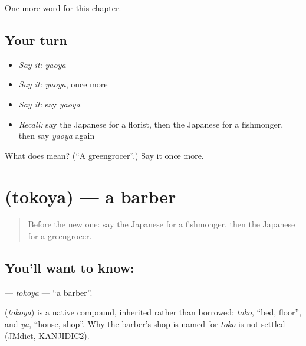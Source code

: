 \begin{grammarlens}[title={What you've built}]
One more word for this chapter.
\end{grammarlens}

\subsection*{Your turn}
\begin{itemize}
\raggedright
  \item \emph{Say it:} \emph{yaoya}
  \item \emph{Say it:} \emph{yaoya}, once more
  \item \emph{Say it:} say \emph{yaoya}
  \item \emph{Recall:} say the Japanese for a florist, then the Japanese for a fishmonger, then say \emph{yaoya} again
\end{itemize}

\begin{tcolorbox}[breakable,colback=teal!4,colframe=teal!35!black,title={Before you move on}]
What does  mean? (\textquotedblleft{}A greengrocer\textquotedblright{}.) Say it once more.
\end{tcolorbox}
\section[\texorpdfstring{\ja{とこや} (tokoya)}{とこや (tokoya)}]{ (tokoya) — a barber}

\label{lesson:JA-C119-tokoya}



\begin{quote}
Before the new one: say the Japanese for a fishmonger, then the Japanese for a greengrocer.
\end{quote}

\subsection*{You'll want to know: }
\textbf{} — \emph{tokoya} — \textquotedblleft{}a barber\textquotedblright{}.

\begin{cousinweb}
\textbf{} (\emph{tokoya}) is a native compound, inherited rather than borrowed: \emph{toko}, \textquotedblleft{}bed, floor\textquotedblright{}, and \emph{ya}, \textquotedblleft{}house, shop\textquotedblright{}. Why the barber's shop is named for \emph{toko} is not settled (JMdict, KANJIDIC2).
\end{cousinweb}

